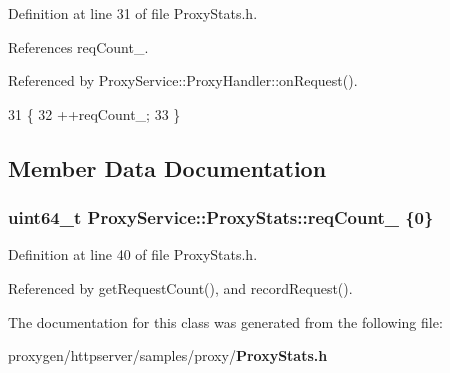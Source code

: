 Definition at line 31 of file Proxy\+Stats.\+h.



References req\+Count\+\_\+.



Referenced by Proxy\+Service\+::\+Proxy\+Handler\+::on\+Request().


\begin{DoxyCode}
31                                \{
32     ++reqCount_;
33   \}
\end{DoxyCode}


\subsection{Member Data Documentation}
\subsubsection[{req\+Count\+\_\+}]{\setlength{\rightskip}{0pt plus 5cm}uint64\+\_\+t Proxy\+Service\+::\+Proxy\+Stats\+::req\+Count\+\_\+ \{0\}\hspace{0.3cm}{\ttfamily [private]}}\label{classProxyService_1_1ProxyStats_aeacb71ec7bc4a05316ddfbf59d7f67c5}


Definition at line 40 of file Proxy\+Stats.\+h.



Referenced by get\+Request\+Count(), and record\+Request().



The documentation for this class was generated from the following file\+:\begin{DoxyCompactItemize}
\item 
proxygen/httpserver/samples/proxy/{\bf Proxy\+Stats.\+h}\end{DoxyCompactItemize}
